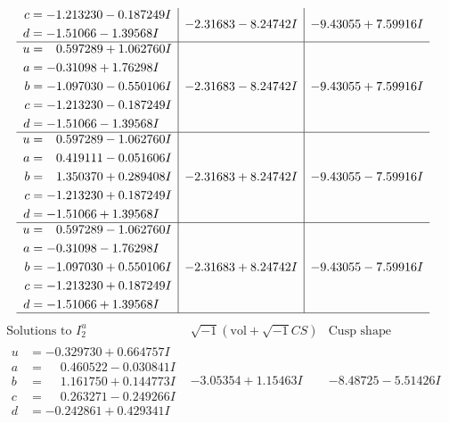 \documentclass[1p]{elsarticle_modified}
\theoremstyle{definition}
\newcommand{\I}{\sqrt{-1}}
\begin{document}
$$\begin{array}{c|c|c}
\begin{aligned}
c &= -1.213230 - 0.187249 I \\
d &= -1.51066 - 1.39568 I\end{aligned}
 & -2.31683 - 8.24742 I & -9.43055 + 7.59916 I \\ \hline\begin{aligned}
u &= \phantom{-}0.597289 + 1.062760 I \\
a &= -0.31098 + 1.76298 I \\
b &= -1.097030 - 0.550106 I \\
c &= -1.213230 - 0.187249 I \\
d &= -1.51066 - 1.39568 I\end{aligned}
 & -2.31683 - 8.24742 I & -9.43055 + 7.59916 I \\ \hline\begin{aligned}
u &= \phantom{-}0.597289 - 1.062760 I \\
a &= \phantom{-}0.419111 - 0.051606 I \\
b &= \phantom{-}1.350370 + 0.289408 I \\
c &= -1.213230 + 0.187249 I \\
d &= -1.51066 + 1.39568 I\end{aligned}
 & -2.31683 + 8.24742 I & -9.43055 - 7.59916 I \\ \hline\begin{aligned}
u &= \phantom{-}0.597289 - 1.062760 I \\
a &= -0.31098 - 1.76298 I \\
b &= -1.097030 + 0.550106 I \\
c &= -1.213230 + 0.187249 I \\
d &= -1.51066 + 1.39568 I\end{aligned}
 & -2.31683 + 8.24742 I & -9.43055 - 7.59916 I\\
 \hline 
 \end{array}$$\newpage$$\begin{array}{c|c|c}  
\text{Solutions to }I^u_{2}& \I (\text{vol} + \sqrt{-1}CS) & \text{Cusp shape}\\
 \hline 
\begin{aligned}
u &= -0.329730 + 0.664757 I \\
a &= \phantom{-}0.460522 - 0.030841 I \\
b &= \phantom{-}1.161750 + 0.144773 I \\
c &= \phantom{-}0.263271 - 0.249266 I \\
d &= -0.242861 + 0.429341 I\end{aligned}
 & -3.05354 + 1.15463 I & -8.48725 - 5.51426 I \\ \hline\begin{aligned}

\end{aligned}
\end{array}$$
\end{document}
